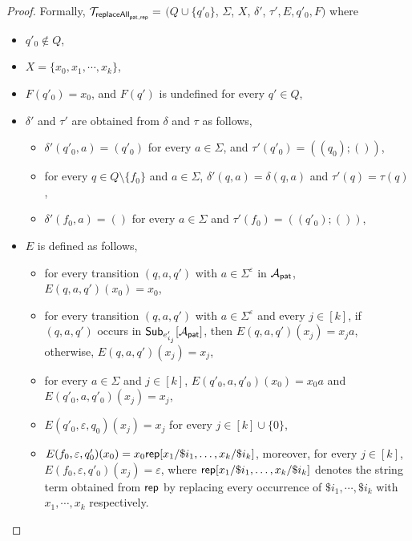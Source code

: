\begin{proof}
        Formally, $\mathcal{T}_{\mathsf{replaceAll}_{\mathsf{pat}, \mathsf{rep}}} =$ $(Q \cup \{q'_0\}$, $\Sigma$, $X$, $\delta'$, $\tau', E, q'_0, F)$ where
        \begin{itemize}
            \item $q'_0 \not \in Q$,

            \item  $X = \{x_0, x_1, \cdots, x_k\}$,
            \item $F(q'_0) = x_0$, and $F(q')$ is undefined for every $q' \in Q$,
            \item $\delta'$ and $\tau'$ are obtained from $\delta$ and $\tau$ as follows,
                \begin{itemize}
                    \item $\delta'(q'_0, a) = (q'_0)$ for every $a \in \Sigma$, and $\tau'(q'_0) = ((q_0); ())$,
                    \item for every $q \in Q \setminus \{f_0\}$ and $a \in \Sigma$, $\delta'(q, a) = \delta(q, a)$ and $\tau'(q) = \tau(q)$,
                    \item $\delta'(f_0, a) = ()$ for every $a \in \Sigma$ and $\tau'(f_0) = ((q'_0); ())$,
                \end{itemize}
            \item $E$ is defined as follows,
                \begin{itemize}
                    \item for every transition $(q, a, q')$ with $a \in \Sigma^\varepsilon$ in $\mathcal{A}_{\mathsf{pat}}$, $E(q, a, q')(x_0) = x_0$,
                    \item for every transition $(q, a, q')$ with $a \in \Sigma^\varepsilon$ and every $j \in [k]$,  if $(q, a, q')$ occurs in ${\sf Sub}_{e'_{i_j}}[\mathcal{A}_{\mathsf{pat}}]$, then $E(q, a, q')(x_j) = x_ja$, otherwise, $E(q, a, q')(x_j) = x_j$,
                    \item  for every $a \in \Sigma$ and $j \in [k]$, $E(q'_0, a, q'_0)(x_0) = x_0a$ and $E(q'_0, a, q'_0)$$(x_j) = x_j$,

                    \item $E(q'_0, \varepsilon, q_0)(x_j) = x_j$ for every $j \in [k] \cup \{0\}$,
                    \item $E(f_0, \varepsilon, q'_0)(x_0) = x_0 \mathsf{rep}[x_1/\$i_1,\ldots, x_k/\$i_k]$, moreover, for every $j \in [k]$, $E(f_0, \varepsilon, q'_0)(x_j) = \varepsilon$, where $ \mathsf{rep}[x_1/\$i_1,\ldots, x_k/\$i_k]$ denotes the string term obtained from $\mathsf{rep}$ by replacing every occurrence of $\$i_1,\cdots, \$i_k$ with $x_1,\cdots,x_k$ respectively.
                \end{itemize}
        \end{itemize}
        \end{proof}

